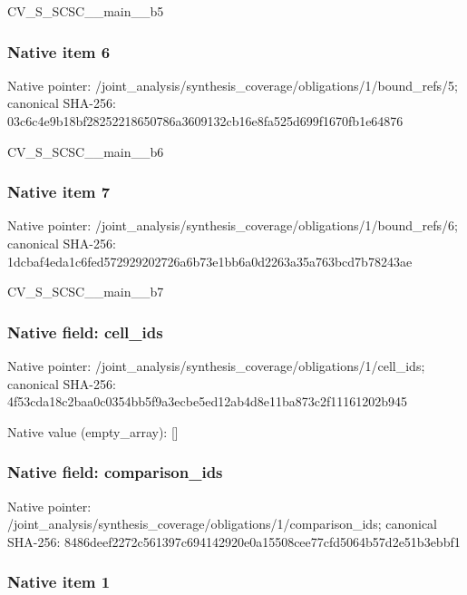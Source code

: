 \documentclass[10pt,a4paper]{article}
\begin{document}
CV\_S\_SCSC\_\_main\_\_b5


\subsubsection{Native item 6}


Native pointer: /joint\_analysis/synthesi\allowbreak{}s\_coverage/obligations/1\allowbreak{}/bound\_refs/5; canonical SHA-256: 03c6c4e9b18bf28252218650\allowbreak{}786a3609132cb16e8fa525d6\allowbreak{}99f1670fb1e64876


CV\_S\_SCSC\_\_main\_\_b6


\subsubsection{Native item 7}


Native pointer: /joint\_analysis/synthesi\allowbreak{}s\_coverage/obligations/1\allowbreak{}/bound\_refs/6; canonical SHA-256: 1dcbaf4eda1c6fed57292920\allowbreak{}2726a6b73e1bb6a0d2263a35\allowbreak{}a763bcd7b78243ae


CV\_S\_SCSC\_\_main\_\_b7


\subsubsection{Native field: cell\_ids}


Native pointer: /joint\_analysis/synthesi\allowbreak{}s\_coverage/obligations/1\allowbreak{}/cell\_ids; canonical SHA-256: 4f53cda18c2baa0c0354bb5f\allowbreak{}9a3ecbe5ed12ab4d8e11ba87\allowbreak{}3c2f11161202b945



Native value (empty\_array): []



\subsubsection{Native field: comparison\_ids}


Native pointer: /joint\_analysis/synthesi\allowbreak{}s\_coverage/obligations/1\allowbreak{}/comparison\_ids; canonical SHA-256: 8486deef2272c561397c6941\allowbreak{}42920e0a15508cee77cfd506\allowbreak{}4b57d2e51b3ebbf1



\subsubsection{Native item 1}
\end{document}
